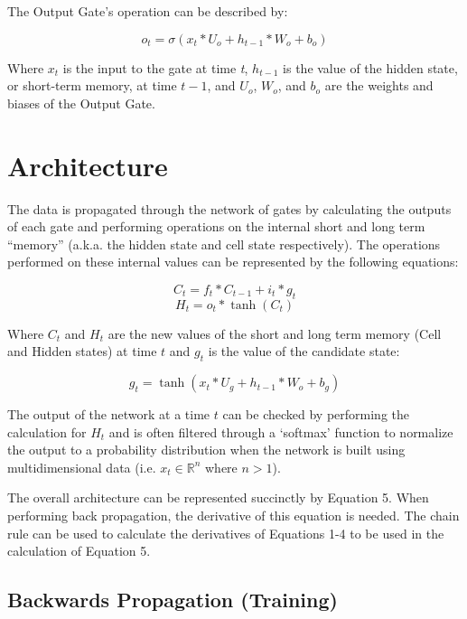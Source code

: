 \documentclass[12pt]{article}
\begin{document}
The Output Gate's operation can be described by:

\begin{equation}
    \label{eqn:o_t}
    o_t = \sigma(x_t*U_o + h_{t-1}*W_o + b_o)
\end{equation}

Where $x_t$ is the input to the gate at time \emph{t}, $h_{t-1}$ is the value
of the hidden state, or short-term memory, at time $t - 1$, and $U_o$, $W_o$,
and $b_o$ are the weights and biases of the Output Gate.

\section{Architecture}

The data is propagated through the network of gates by calculating the outputs
of each gate and performing operations on the internal short and long term
``memory'' (a.k.a. the hidden state and cell state respectively). The
operations performed on these internal values can be represented by the
following equations:

\begin{equation}
    C_t = f_t*C_{t-1} + i_t*g_t
\end{equation}
\begin{equation}
    H_t = o_t*\tanh(C_t)
\end{equation}

Where $C_t$ and $H_t$ are the new values of the short and long term memory
(Cell and Hidden states) at time $t$ and $g_t$ is the value of the candidate
state:

\begin{equation}
    \label{eqn:g_t}
    g_t = \tanh(x_t*U_g + h_{t-1}*W_o + b_g)
\end{equation}

The output of the network at a time $t$ can be checked by performing the
calculation for $H_t$ and is often filtered through a `softmax' function to
normalize the output to a probability distribution when the network is built
using multidimensional data (i.e. $x_t \in \mathbb{R}^n$ where $n > 1$).

The overall architecture can be represented succinctly by Equation 5. When
performing back propagation, the derivative of this equation is needed. The
chain rule can be used to calculate the derivatives of Equations 1-4 to be used
in the calculation of Equation 5.

\subsection{Backwards Propagation  (Training)}
\end{document}
